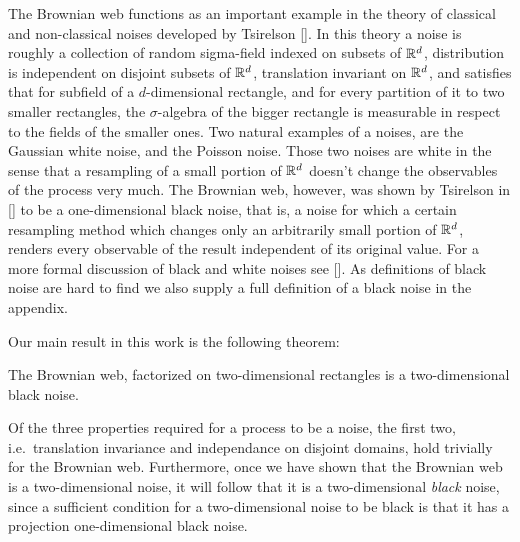 {The Brownian web functions as an important example in the theory of classical
and non-classical noises developed by Tsirelson []. In this theory a noise is
roughly a collection of random sigma-field indexed on subsets of $\mathbb{R}^d$,
distribution is independent on disjoint subsets of $\mathbb{R}^d$, translation
invariant on $\mathbb{R}^d$, and satisfies that for subfield of a $d$-dimensional
rectangle, and for every partition of it to two smaller rectangles, the $\sigma$-algebra
of the bigger rectangle is measurable in respect to the fields of the
smaller ones. Two natural examples of a noises, are the Gaussian white noise,
and the Poisson noise. Those two noises are white in the sense that a
resampling of a small portion of $\mathbb{R}^d$ doesn't change the observables of the
process very much. The Brownian web, however, was shown by Tsirelson in [] to
be a one-dimensional black noise, that is, a noise for which a certain
resampling method which changes only an arbitrarily small portion of $\mathbb{R}^d$,
renders every observable of the result independent of its original value. For
a more formal discussion of black and white noises see []. As definitions of
black noise are hard to find we also supply a full definition of a black
noise in the appendix.

Our main result in this work is the following theorem:

\begin{theorem}
\label{thm:bw-2d-black-noise}
The Brownian web, factorized on two-dimensional rectangles is a
two-dimensional black noise.
\end{theorem}

Of the three properties required for a process to be a noise, the
first two, i.e.\ translation invariance and independance on disjoint
domains, hold trivially for the Brownian web.  Furthermore, once we
have shown that the Brownian web is a two-dimensional noise, it will
follow that it is a two-dimensional \emph{black} noise, since a
sufficient condition for a two-dimensional noise to be black is that
it has a projection one-dimensional black noise.


}
